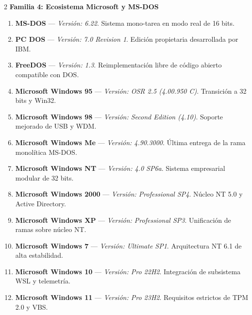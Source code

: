 \documentclass[12pt]{article}
\begin{document}
\begin{multicols}{2}
\medskip
\noindent\textbf{Familia 4: Ecosistema Microsoft y MS-DOS}\par\smallskip
\begin{enumerate}[label=\textbf{\arabic*.}, leftmargin=*, noitemsep, topsep=1pt, start=55]
    \item \textbf{MS-DOS} --- \textit{Versión: 6.22}. Sistema mono-tarea en modo real de 16 bits.
    \item \textbf{PC DOS} --- \textit{Versión: 7.0 Revision 1}. Edición propietaria desarrollada por IBM.
    \item \textbf{FreeDOS} --- \textit{Versión: 1.3}. Reimplementación libre de código abierto compatible con DOS.
    \item \textbf{Microsoft Windows 95} --- \textit{Versión: OSR 2.5 (4.00.950 C)}. Transición a 32 bits y Win32.
    \item \textbf{Microsoft Windows 98} --- \textit{Versión: Second Edition (4.10)}. Soporte mejorado de USB y WDM.
    \item \textbf{Microsoft Windows Me} --- \textit{Versión: 4.90.3000}. Última entrega de la rama monolítica MS-DOS.
    \item \textbf{Microsoft Windows NT} --- \textit{Versión: 4.0 SP6a}. Sistema empresarial modular de 32 bits.
    \item \textbf{Microsoft Windows 2000} --- \textit{Versión: Professional SP4}. Núcleo NT 5.0 y Active Directory.
    \item \textbf{Microsoft Windows XP} --- \textit{Versión: Professional SP3}. Unificación de ramas sobre núcleo NT.
    \item \textbf{Microsoft Windows 7} --- \textit{Versión: Ultimate SP1}. Arquitectura NT 6.1 de alta estabilidad.
    \item \textbf{Microsoft Windows 10} --- \textit{Versión: Pro 22H2}. Integración de subsistema WSL y telemetría.
    \item \textbf{Microsoft Windows 11} --- \textit{Versión: Pro 23H2}. Requisitos estrictos de TPM 2.0 y VBS.
\end{enumerate}


\end{multicols}
\end{document}
